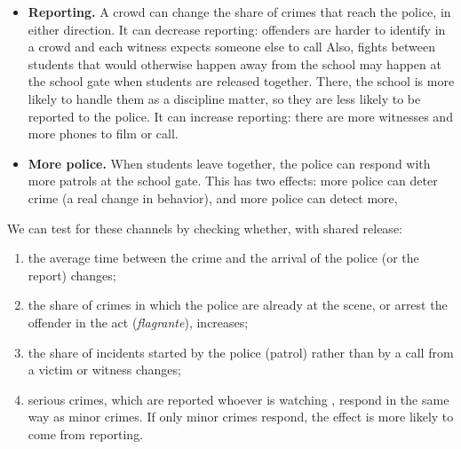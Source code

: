 \begin{enumerate}
            \begin{itemize}
                  \item \textbf{Reporting.} A crowd can change the share of
                        crimes that reach the police, in either direction.
                        It can decrease reporting:                       offenders are harder to identify in a crowd and
                         each witness expects
                        someone else to call
                   Also, fights between students that would otherwise happen away from the school
may happen at the school gate when students are released together. There, the
school is more likely to handle them as a discipline matter, so they are less
likely to be reported to the police.
                         It can increase reporting: there are
                        more witnesses and more phones to film or call.
                  \item \textbf{More police.} When students leave together,
                        the police can respond with more patrols at the school
                        gate. This has two effects: more
                        police can deter crime (a real change in
                        behavior), and more police can detect more, 
            \end{itemize}
            We can test for these channels by checking whether, with shared
            release:
            \begin{enumerate}
                  \item the average time between the crime and the arrival of
                        the police (or the report) changes;
                  \item the share of crimes in which the police are already at
                        the scene, or arrest the offender in the act
                        (\emph{flagrante}), increases;
                  \item the share of incidents started by the police (patrol)
                        rather than by a call from a victim or witness changes;
                  \item serious crimes, which are reported whoever is watching
                       , respond in the same way as
                        minor crimes. If only minor crimes respond, the effect
                        is more likely to come from reporting.
            \end{enumerate}
\end{enumerate}





